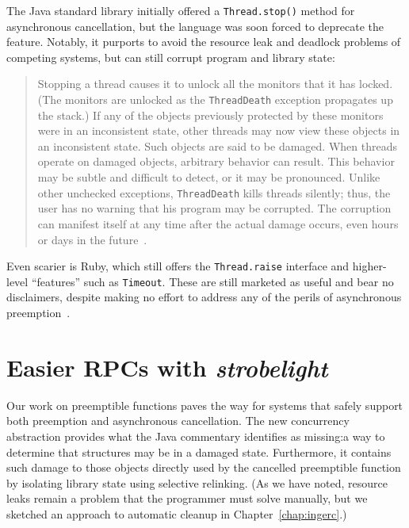The Java standard library initially offered a \texttt{Thread.stop()} method for
asynchronous cancellation, but the language was soon forced to deprecate the feature.
Notably, it purports to avoid the resource leak and deadlock problems of competing
systems, but can still corrupt program and library state:
\begin{quote}
Stopping a thread causes it to unlock all the monitors that it has locked.  (The
monitors are unlocked as the \texttt{ThreadDeath} exception propagates up the stack.)
If any of the objects previously protected by these monitors were in an inconsistent
state, other threads may now view these objects in an inconsistent state.  Such
objects are said to be damaged. When threads operate on damaged objects, arbitrary
behavior can result.  This behavior may be subtle and difficult to detect, or it may
be pronounced.  Unlike other unchecked exceptions, \texttt{ThreadDeath} kills threads
silently; thus, the user has no warning that his program may be corrupted.  The
corruption can manifest itself at any time after the actual damage occurs, even hours
or days in the future~\cite{www-java-stop}.
\end{quote}

Even scarier is Ruby, which still offers the \texttt{Thread.raise} interface and
higher-level ``features'' such as \texttt{Timeout}.  These are still marketed as
useful and bear no disclaimers, despite making no effort to address any of the perils
of asynchronous preemption~\cite{www-ruby-danger-terrifying}.


\section{Easier RPCs with \textit{strobelight}}

Our work on preemptible functions paves the way for systems that safely support both
preemption and asynchronous cancellation.  The new concurrency abstraction provides
what the Java commentary identifies as missing:\@ a way to determine that structures
may be in a damaged state.  Furthermore, it contains such damage to those objects
directly used by the cancelled preemptible function by isolating library
state using selective relinking.  (As we have noted, resource leaks remain a problem
that the programmer must solve manually, but we sketched an approach to automatic
cleanup in Chapter~\ref{chap:ingerc}.)

